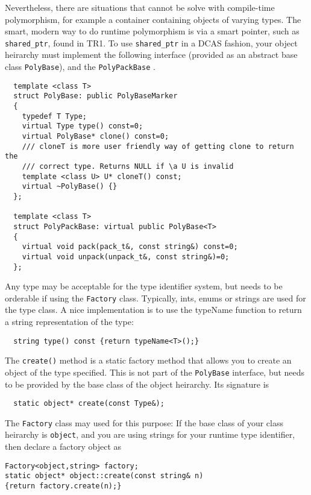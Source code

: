 Nevertheless, there are situations that cannot be solve with
compile-time polymorphism, for example a container containing objects
of varying types. The smart, modern way to do runtime polymorphism is
via a smart pointer, such as \verb+shared_ptr+, found in TR1. To use
\verb+shared_ptr+ in a DCAS fashion, your object heirarchy must
implement the following interface (provided as an abstract base class
\verb+PolyBase+), and the \verb+PolyPackBase+ .

\begin{verbatim}
  template <class T>
  struct PolyBase: public PolyBaseMarker
  {
    typedef T Type;
    virtual Type type() const=0;
    virtual PolyBase* clone() const=0;
    /// cloneT is more user friendly way of getting clone to return the
    /// correct type. Returns NULL if \a U is invalid
    template <class U> U* cloneT() const;
    virtual ~PolyBase() {}
  };

  template <class T>
  struct PolyPackBase: virtual public PolyBase<T>
  {
    virtual void pack(pack_t&, const string&) const=0;
    virtual void unpack(unpack_t&, const string&)=0;
  };
\end{verbatim}

Any type may be acceptable for the type identifier system, but needs
to be orderable if using the \verb+Factory+
class. Typically, ints, enums or strings are used for
the type class. A nice implementation is to use the typeName function
to return a string representation of the type:
\begin{verbatim}
  string type() const {return typeName<T>();}
\end{verbatim}

The \verb+create()+ method is a static factory method that allows you to
create an object of the type  specified. This is not part of the
\verb+PolyBase+ interface, but needs to be provided by the base class
of the object heirarchy. Its signature is
\begin{verbatim}
  static object* create(const Type&);
\end{verbatim}

The \verb+Factory+ class may used for this purpose: If the base class
of your class heirarchy is \verb+object+, and you are using strings
for your runtime type identifier, then declare a factory object as
\begin{verbatim}
Factory<object,string> factory;
static object* object::create(const string& n)
{return factory.create(n);}
\end{verbatim}


